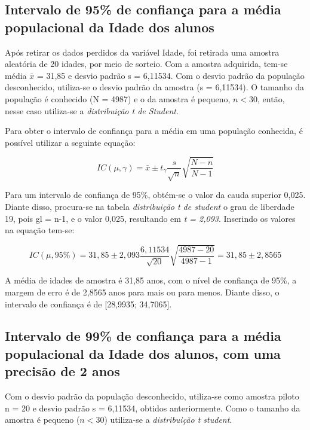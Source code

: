 \subsection{Intervalo de 95\% de confiança para a média populacional da Idade dos alunos}
\label{sub:1a}
	
	Após retirar os dados perdidos da variável Idade, foi retirada uma amostra
	aleatória de 20 idades, por meio de sorteio. Com a amostra adquirida, tem-se
	média $\bar{x}$ = 31,85 e desvio padrão s = 6,11534. Com o desvio padrão da
	população desconhecido, utiliza-se o desvio padrão da amostra (s = 6,11534).
	O tamanho da população é conhecido (N = 4987) e o da amostra é pequeno, $n <
	30$, então, nesse caso utiliza-se a \textit{distribuição t de Student}.

Para obter o intervalo de confiança para a média em uma população conhecida,
é possível utilizar a seguinte equação:

\begin{equation*}
 IC (\mu, \gamma) = \bar{x} \pm t_\gamma \frac{s}{\sqrt{n}} \sqrt{\frac{N-n}{N-1}}
\end{equation*}

Para um intervalo de confiança de 95\%, obtém-se o valor da cauda superior 0,025. Diante disso, procura-se na tabela \textit{distribuição t de student} o grau de liberdade 19, pois gl = n-1, e o 
valor 0,025, resultando em \textit{t = 2,093}. Inserindo os valores na equação tem-se:

\begin{equation*}
 IC (\mu, 95\%) = 31,85 \pm 2,093 \frac{6,11534}{\sqrt{20}} \sqrt{\frac{4987 - 20}{4987 - 1}} 
                = 31,85 \pm 2,8565
\end{equation*}

A média de idades de amostra é 31,85 anos, com o nível de confiança de 95\%, a margem de erro é de 2,8565 anos para mais ou para menos. Diante disso, o intervalo de confiança é de [28,9935; 34,7065].

\subsection{Intervalo de 99\% de confiança para a média populacional da Idade dos alunos, com uma precisão de 2 anos}

	Com o desvio padrão da população desconhecido, utiliza-se como amostra
	piloto n = 20 e desvio padrão s = 6,11534, obtidos anteriormente. Como o
	tamanho da amostra é pequeno ($n < 30$) utiliza-se a \textit{distribuição t
	student}.

